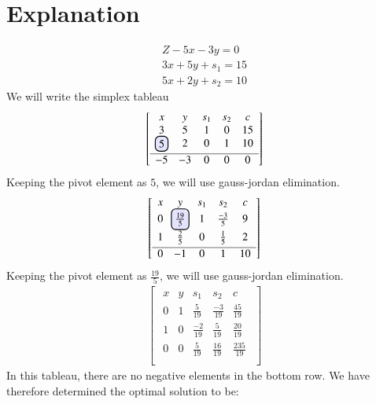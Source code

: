 \documentclass[journal,12pt,twocolumn]{IEEEtran}
\begin{document}
\section{Explanation}
\begin{align}
Z-5x-3y=0\\
3x+5y+s_1=15\\
5x+2y+s_2=10
\end{align}
We will write the simplex tableau
\begin{align}
\begin{bmatrix}
\begin{array}{ccccc}
  x & y & s_1 & s_2 & c  \\ 
  3 & 5 & 1 & 0 & 15 \\ 
  \hlight{5} & 2 & 0 & 1 & 10  \\[0.1cm] \hline
  -5 & -3 & 0 & 0 & 0 \\
\end{array}
\end{bmatrix}
\end{align}
Keeping the pivot element as $5$, we will use gauss-jordan elimination.
\begin{align}
\begin{bmatrix}
\begin{array}{ccccc}
  x & y & s_1 & s_2 & c  \\[0.1cm] 
  0 & \hlight{\frac{19}{5}} & 1 & \frac{-3}{5} & 9 \\[0.15cm] 
  1 & \frac{2}{5} & 0 & \frac{1}{5} & 2  \\[0.1cm] \hline
  0 & -1 & 0 & 1 & 10 \\
\end{array}
\end{bmatrix}
\end{align}
Keeping the pivot element as $\frac{19}{5}$, we will use gauss-jordan elimination.
\begin{align}
\begin{bmatrix}
\begin{array}{ccccc}
  x & y & s_1 & s_2 & c  \\ 
  0 & 1 & \frac{5}{19} & \frac{-3}{19} & \frac{45}{19} \\ 
  1 & 0 & \frac{-2}{19} & \frac{5}{19} & \frac{20}{19}  \\[0.1cm] \hline 
  0 & 0 & \frac{5}{19} & \frac{16}{19} & \frac{235}{19} \\
\end{array}
\end{bmatrix}
\end{align}
In this tableau, there are no negative elements in the bottom row. We have therefore determined the optimal solution to be:
\end{document}
